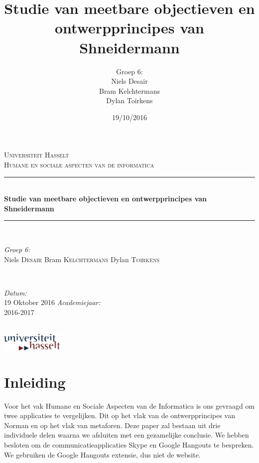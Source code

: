 \documentclass[11pt]{article}
\author{Groep 6:\\
		Niels Desair\\
		Bram Kelchtermans\\
		Dylan Toirkens}
\title{\textbf{Studie van meetbare objectieven en ontwerpprincipes van Shneidermann}}
\date{19/10/2016}
\begin{document}
	\begin{titlepage}
		
		\newcommand{\HRule}{\rule{\linewidth}{0.5mm}} %
		
		\begin{center} %
			
			\textsc{\LARGE Universiteit Hasselt}\\[1.5cm] %
			\textsc{\Large Humane en sociale aspecten van de informatica}\\[0.5cm] %
			
			\HRule \\[0.4cm]
			{ \huge \bfseries Studie van meetbare objectieven en ontwerpprincipes van Shneidermann}\\[0.4cm]
			\HRule \\[1.5cm]
			
			\begin{minipage}{0.4\textwidth}
				\begin{flushleft} \large
					\emph{Groep 6:}\\
					Niels \textsc{Desair} \newline
					Bram \textsc{Kelchtermans} \newline
					Dylan \textsc{Toirkens}
				\end{flushleft}
			\end{minipage}
			~
			\begin{minipage}{0.4\textwidth}
				\begin{flushright} \large
					\emph{Datum:}\\
					19 Oktober 2016
					\emph{Academiejaar: } \\
					2016-2017
				\end{flushright}
			\end{minipage}\\[4cm]
			\vspace{40 mm}
			\includegraphics[width=3.0cm]{uhasselt-logo}\\[2.0cm]  
		\end{center}
	\end{titlepage}

\section{Inleiding}
Voor het vak Humane en Sociale Aspecten van de Informatica is ons gevraagd om twee applicaties te vergelijken. Dit op het vlak van de ontwerpprincipes van Norman en op het vlak van metaforen. Deze paper zal bestaan uit drie individuele delen waarna we afsluiten met een gezamelijke conclusie. We hebben besloten om de communicatieapplicaties Skype en Google Hangouts te bespreken. We gebruiken de Google Hangouts extensie, dus niet de website.
\newpage
\end{document}
